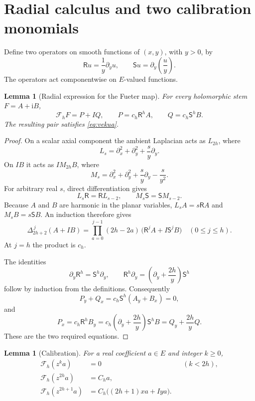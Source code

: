\documentclass[11pt,a4paper]{article}
\numberwithin{equation}{section}
\newtheorem{lemma}[theorem]{Lemma}
\theoremstyle{definition}
\theoremstyle{remark}
\newcommand{\ii}{\mathrm i}
\newcommand{\Fu}{\mathcal F_h}
\newcommand{\Rop}{\mathsf R}
\newcommand{\Sop}{\mathsf S}
\begin{document}
\section{Radial calculus and two calibration monomials}
\label{sec:radial}

Define two operators on smooth functions of $(x,y)$, with $y>0$, by
\[
 \Rop u=\frac1y\partial_yu,\qquad
 \Sop u=\partial_y\!\left(\frac uy\right).
\]
The operators act componentwise on $E$-valued functions.

\begin{lemma}[Radial expression for the Fueter map]\label{lem:radial}
For every holomorphic stem $F=A+\ii B$,
\begin{equation}\label{eq:radial}
 \Fu F=P+IQ,\qquad
 P=c_h\Rop^hA,\qquad Q=c_h\Sop^hB.
\end{equation}
The resulting pair satisfies \eqref{eq:vekua}.
\end{lemma}

\begin{proof}
On a scalar axial component the ambient Laplacian acts as $L_{2h}$, where
\[
 L_s=\partial_x^2+\partial_y^2+\frac{s}{y}\partial_y.
\]
On $IB$ it acts as $I M_{2h}B$, where
\[
 M_s=\partial_x^2+\partial_y^2+\frac{s}{y}\partial_y-\frac{s}{y^2}.
\]
For arbitrary real $s$, direct differentiation gives
\[
 L_s\Rop=\Rop L_{s-2},\qquad M_s\Sop=\Sop M_{s-2}.
\]
Because $A$ and $B$ are harmonic in the planar variables,
$L_sA=s\Rop A$ and $M_sB=s\Sop B$. An induction therefore gives
\[
 \Delta_{2h+2}^{\,j}(A+IB)
 =\prod_{a=0}^{j-1}(2h-2a)\,\bigl(\Rop^jA+I\Sop^jB\bigr)
 \quad(0\le j\le h).
\]
At $j=h$ the product is $c_h$.

The identities
\[
 \partial_y\Rop^h=\Sop^h\partial_y,
 \qquad
 \Rop^h\partial_y=\left(\partial_y+\frac{2h}{y}\right)\Sop^h
\]
follow by induction from the definitions. Consequently
\[
 P_y+Q_x=c_h\Sop^h(A_y+B_x)=0,
\]
and
\[
 P_x=c_h\Rop^h B_y
 =c_h\left(\partial_y+\frac{2h}{y}\right)\Sop^hB
 =Q_y+\frac{2h}{y}Q.
\]
These are the two required equations.
\end{proof}

\begin{lemma}[Calibration]\label{lem:calibration}
For a real coefficient $a\in E$ and integer $k\ge0$,
\begin{align}
 \Fu(z^ka)&=0 &&(k<2h),\label{eq:low-calibration}\\
 \Fu(z^{2h}a)&=C_h a,\label{eq:even-calibration}\\
 \Fu(z^{2h+1}a)&=C_h\bigl((2h+1)xa+Iy a\bigr).
 \label{eq:odd-calibration}
\end{align}
\end{lemma}
\end{document}
